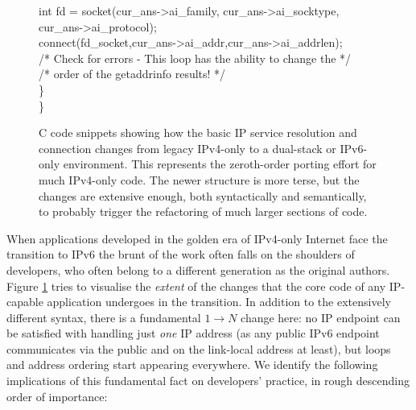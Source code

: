 \begin{figure}
\begin{framed}
{\qquad\qquad int fd = socket(cur\_ans->ai\_family, cur\_ans->ai\_socktype,\\
\qquad\qquad\qquad cur\_ans->ai\_protocol);\\
\qquad\qquad connect(fd\_socket,cur\_ans->ai\_addr,cur\_ans->ai\_addrlen);\\
\qquad\qquad /* Check for errors - This loop has the ability to change the */\\
\qquad\qquad /* order of the getaddrinfo results! */\\
\qquad \}\\
\}
}
\end{framed}
\caption{C code snippets showing how the basic IP service resolution and connection 
 changes from legacy IPv4-only to a dual-stack or IPv6-only environment. This represents
 the zeroth-order porting effort for much IPv4-only code. The newer structure
 is more terse, but the changes are extensive enough, both syntactically and
 semantically, to probably trigger the refactoring of much larger sections of code.}
\label{fig:pseudocode}
\end{figure}
When applications developed in the golden
era of IPv4-only Internet face the transition to IPv6 the brunt of the
work often falls on the shoulders of developers, who often belong to a different
generation as the original authors. Figure \ref{fig:pseudocode} tries to
visualise the {\it extent} of the changes that the core code of any
IP-capable application undergoes in the transition. In addition to
the extensively different syntax, there is a
fundamental $1\rightarrow N$ change here:
no IP endpoint can be satisfied with handling just {\it one}
IP address (as any public IPv6 endpoint communicates via the
public and on the link-local address at least), but loops and address
ordering start appearing everywhere. We identify the following implications of this
fundamental fact on developers' practice, in rough descending order
of importance:
